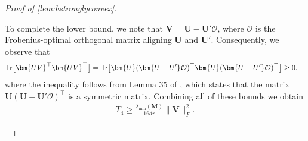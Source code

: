 \documentclass[10pt]{article}
\renewcommand{\t}{^{\top}}
\theoremstyle{definition}
\begin{document}
\begin{proof}[Proof of \cref{lem:hstronglyconvex}]
\begin{itemize}
To complete the lower bound, we note that $\bm{V} = \bm{U - U'}\mathcal{O}$, where $\mathcal{O}$ is the Frobenius-optimal orthogonal matrix aligning $\bm{U}$ and $\bm{U}'$. Consequently, we observe that
\begin{align}
    {\sf Tr}\big[ \bm{UV}\t \bm{UV}\t \big] &= {\sf Tr}\big[ \bm{U}(\bm{U - U'}\mathcal{O})\t \bm{U} ( \bm{U - U'}\mathcal{O})\t \big] \geq 0,
    \end{align}
    where the inequality follows from Lemma 35 of \citet{ma_implicit_2020}, which states that the matrix $\bm{U}(\bm{U} - \bm{U}' \mathcal{O})\t$ is a symmetric matrix.  Combining all of these bounds we obtain
    \begin{align}
        T_4 \geq \frac{\lambda_{\min}(\bm{M})}{16 dr} \|\bm{V}\|_F^2.
    \end{align}



\end{itemize}
\end{proof}
\end{document}
